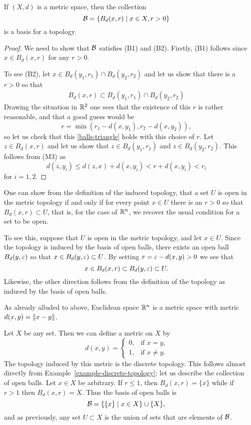 \begin{prop}
  \label{metric-basis}
  If $(X,d)$ is a metric space, then the collection
  \[
    \mathcal{B} = \{ B_d(x,r) \mid x \in X, r > 0\}
  \]
  is a basis for a topology.
\end{prop}
\begin{proof}
  We need to show that $\mathcal{B}$ satisfies (B1) and (B2). Firstly, (B1) follows since $x \in B_d(x,r)$ for any $r > 0$.
  
  To see (B2), let $x \in B_d(y_1,r_1) \cap B_d(y_2,r_2)$ and let us show that there is a $r > 0$ so that
  \begin{align}
    \label{balls-triangle}
    B_d(x,r) \subset B_d(y_1,r_1) \cap B_d(y_2,r_2)
  \end{align}
  Drawing the situation in $\mathbb{R}^2$ one sees that the existence of this $r$ is rather reasonable, and that a good guess would be
  \[
    r = \min(r_1 - d(x,y_1) , r_2 - d(x,y_2)),
  \]
  so let us check that this \eqref{balls-triangle} holds with this choice of $r$. Let $z \in B_d(x,r)$ and let us show that $z \in B_d(y_1,r_1)$ and $z \in B_d(y_2,r_2)$. This follows from (M3) as
  \[
    d(z,y_i) \leq d(z,x) + d(x,y_i) < r + d(x,y_i) < r_i
  \]
  for $i = 1,2$.
\end{proof}
\begin{rem}
  \label{remark-def-open-balls}
  One can show from the definition of the induced topology, that a set $U$ is open in the metric topology if and only if for every point $x \in U$ there is an $r > 0$ so that $B_d(x,r) \subset U$, that is, for the case of $\mathbb{R}^n$, we recover the usual condition for a set to be open.
  
  To see this, suppose that $U$ is open in the metric topology, and let $x \in U$. Since the topology is induced by the basis of open balls, there exists an open ball $B_d(y,\varepsilon)$ so that $x \in B_d(y,\varepsilon) \subset U$. By setting $r = \varepsilon - d(x,y) > 0$ we see that
  \[
    x \in B_d(x,r) \subset B_d(y,\varepsilon) \subset U.
  \]
  Likewise, the other direction follows from the definition of the topology as induced by the basis of open balls.
\end{rem}
\begin{example}
  As already alluded to above, Euclidean space $\mathbb{R}^n$ is a metric space with metric $d(x,y) = \lVert x-y \rVert$.
\end{example}
\begin{example}
  Let $X$ be any set. Then we can define a metric on $X$ by
  \[
    d(x,y) = \begin{cases} 0, & \text{if $x = y$,} \\ 1, & \text{if $x \not= y$.} \end{cases}
  \]
  The topology induced by this metric is the discrete topology. This follows almost directly from Example~\ref{example-discrete-topology}; let us describe the collection of open balls. Let $x \in X$ be arbitrary. If $r \leq 1$, then $B_d(x,r) = \{x\}$ while if $r > 1$ then $B_d(x,r) = X$. Thus the basis of open balls is
  \[
    \mathcal{B} = \{ \{x \} \mid x \in X \} \cup \{X\},
  \]
  and as previously, any set $U \subset X$ is the union of sets that are elements of $\mathcal{B}$.
\end{example}



